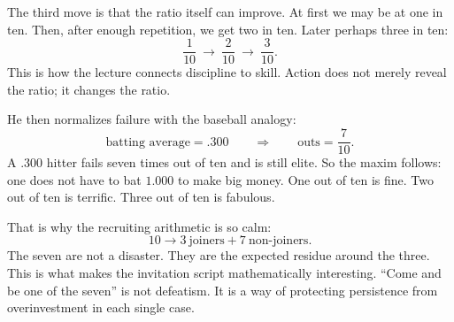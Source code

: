 \begin{figure}[t]
\centering
{}
\end{figure}

The third move is that the ratio itself can improve. At first we may be at one in ten. Then, after enough repetition, we get two in ten. Later perhaps three in ten:
\begin{equation}
\frac{1}{10}\ \to\ \frac{2}{10}\ \to\ \frac{3}{10}.
\end{equation}
This is how the lecture connects discipline to skill. Action does not merely reveal the ratio; it changes the ratio.

He then normalizes failure with the baseball analogy:
\begin{equation}
\text{batting average}=.300
\qquad\Longrightarrow\qquad
\text{outs}=\frac{7}{10}.
\end{equation}
A .300 hitter fails seven times out of ten and is still elite. So the maxim follows: one does not have to bat \(1.000\) to make big money. One out of ten is fine. Two out of ten is terrific. Three out of ten is fabulous.

That is why the recruiting arithmetic is so calm:
\begin{equation}
10 \to 3\ \text{joiners} + 7\ \text{non-joiners}.
\end{equation}
The seven are not a disaster. They are the expected residue around the three. This is what makes the invitation script mathematically interesting. ``Come and be one of the seven'' is not defeatism. It is a way of protecting persistence from overinvestment in each single case.

